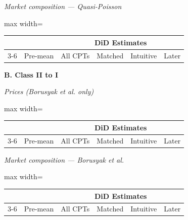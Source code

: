 \documentclass[letterpaper,12pt]{article}
\theoremstyle{definition}
\begin{document}
\begin{table}[t]
\begin{threeparttable}
\begin{minipage}[t]{0.49\textwidth}
\emph{Market composition --- Quasi-Poisson}\par
\begin{adjustbox}{max width=\linewidth}
\begin{tabular}{@{}lccccc@{}}
\toprule
 &  & \multicolumn{4}{c}{DiD Estimates} \\
\cmidrule(lr){3-6}
 & Pre-mean & All CPTs & Matched & Intuitive & Later \\
\midrule

\bottomrule
\end{tabular}
\end{adjustbox}
\end{minipage}\hfill
\begin{minipage}[t]{0.49\textwidth}
\centering\scriptsize
\textbf{B. Class II to I}\par\vspace{4pt}

\emph{Prices (Borusyak et al. only)}\par
\begin{adjustbox}{max width=\linewidth}
\begin{tabular}{@{}lccccc@{}}
\toprule
 &  & \multicolumn{4}{c}{DiD Estimates} \\
\cmidrule(lr){3-6}
 & Pre-mean & All CPTs & Matched & Intuitive & Later \\
\midrule

\bottomrule
\end{tabular}
\end{adjustbox}\vspace{6pt}

\emph{Market composition --- Borusyak et al.}\par
\begin{adjustbox}{max width=\linewidth}
\begin{tabular}{@{}lccccc@{}}
\toprule
 &  & \multicolumn{4}{c}{DiD Estimates} \\
\cmidrule(lr){3-6}
 & Pre-mean & All CPTs & Matched & Intuitive & Later \\
\midrule

\bottomrule
\end{tabular}
\end{adjustbox}\vspace{6pt}


\end{minipage}
\end{threeparttable}
\end{table}
\end{document}
